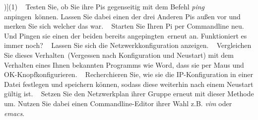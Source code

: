 \documentclass[paper=a4,fontsize=11pt]{scrartcl}%
\numberwithin{equation}{section}
\begin{document}
\begin{itemize}
\begin{tasks}[counter-format=(tsk[r])](1)
	\task~ Testen Sie, ob Sie ihre Pis gegenseitig mit dem Befehl \emph{ping} \glqq anpingen\grqq\ können. Lassen Sie dabei einen der drei Anderen Pis außen vor und merken Sie sich welcher das war.
	\task~ Starten Sie Ihren Pi per Commandline neu. Und Pingen sie einen der beiden bereits \glqq angepingten\grqq\ erneut an. Funktioniert es immer noch?
	\task~ Lassen Sie sich die Netzwerkkonfiguration anzeigen. 
	\task~ Vergleichen Sie dieses \glqq Verhalten\grqq\ (Vergessen nach Konfiguration und Neustart) mit dem Verhalten eines Ihnen bekannten Programms wie Word, dass sie per \glqq Maus und OK-Knopf\grqq konfigurieren.
	\task~ Recherchieren Sie, wie sie die IP-Konfiguration in einer Datei festlegen und speichern können, sodass diese weiterhin nach einem Neustart gültig ist.
	\task~ Setzen Sie den Netzwerkplan ihrer Gruppe erneut mit dieser Methode um. Nutzen Sie dabei einen Commandline-Editor ihrer Wahl z.B. \emph{vim} oder \emph{emacs}.
\end{tasks}
\end{itemize}
\end{document}
